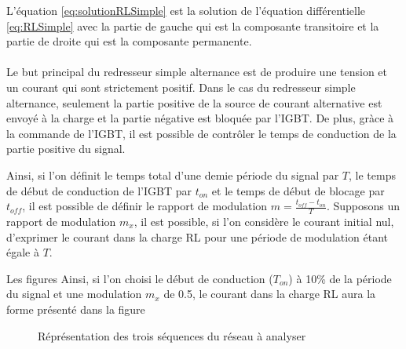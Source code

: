 \documentclass[11pt,letterpaper,final]{report}
\begin{document}
L'équation \ref{eq:solutionRLSimple} est la solution de l'équation différentielle \ref{eq:RLSimple} avec la partie de gauche qui est la composante transitoire et la partie de droite qui est la composante permanente. 

\paragraph{}
Le but principal du redresseur simple alternance est de produire une tension et un courant qui sont strictement positif. Dans le cas du redresseur simple alternance, seulement la partie positive de la source de courant alternative est envoyé à la charge et la partie négative est bloquée par l'IGBT. De plus, gràce à la commande de l'IGBT, il est possible de contrôler le temps de conduction de la partie positive du signal.

Ainsi, si l'on définit le temps total d'une demie période du signal par $T$, le temps de début de conduction de l'IGBT par $t_{on}$ et le temps de début de blocage par $t_{off}$, il est possible de définir le rapport de modulation $m = \frac{t_{off}-t_{on}}{T}$. Supposons un rapport de modulation $m_x$, il est possible, si l'on considère le courant initial nul, d'exprimer le courant dans la charge RL pour une période de modulation étant égale à $T$.

Les figures Ainsi, si l'on choisi le début de conduction ($T_{on}$) à 10\% de la période du signal et une modulation $m_x$ de 0.5, le courant dans la charge RL aura la forme présenté dans la figure

\begin{figure}
        \centering       
        \begin{subfigure}[Séquence directe du réseau à étudier]{
         		\label{fig:RedresseurMonophaseSimpleAlternanceIGBTCourbes50}
                \texttt{[image: RedresseurMonophaseSimpleAlternance50]}}
        \end{subfigure}
        
        \begin{subfigure}[Séquence inverse du réseau à étudier]{
         		\label{fig:RedresseurMonophaseSimpleAlternanceIGBTCourbes100}
                \texttt{[image: RedresseurMonophaseSimpleAlternance100]}}
        \end{subfigure}
        \caption{Réprésentation des trois séquences du réseau à analyser}\label{fig:RedresseurMonophaseSimpleAlternanceIGBTCourbes}
\end{figure}
\end{document}
